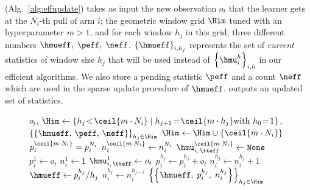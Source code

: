 \EFF (Alg.~\ref{alg:effupdate}) takes as input the new observation $o_t$ that the learner gets at the $N_i$-th pull of arm $i$; the geometric window grid $\Him$ tuned with an hyperparameter $m>1$, and for each window $h_j$ in this grid, three different numbers $\hmueff,\; \peff, \; \neff$. $\left\{\hmueff\right\}_{i,h_j}$ represents the set of \emph{current} statistics of window size $h_j$ that will be used instead of $\left\{\hmu_i^h\right\}_{i,h}$ in our efficient algorithms. We also store a pending statistic $\peff$ and a count $\neff$  which are used in the sparse update procedure of $\hmueff$. \EFF outputs an updated set of statistics.  
\begin{figure}[!ht]
\begin{minipage}{\textwidth}
\renewcommand*\footnoterule{}
\begin{savenotes}
\begin{algorithm}[H]
\caption{{\EFF}}
\label{alg:effupdate}
\begin{algorithmic}[1]
\Require $o_t$, \small $\Him \gets \left\{h_j \! <\! \ceil{m \cdot N_i} \; | \;  h_{j+1} \!=\! \ceil{m \cdot h_j}  \text{with } h_0 \!=\! 1\right\} $\normalsize, $\left\{ \{ \hmueff,\, \peff, \, \neff \}\right\}_{h_j \in \Him}$
\label{algline:effu-new-condition}   
\State $\Him \gets \Him \cup \left\{ \ceil{m \cdot N_i} \right\}$\label{algline:effu-new-h}
\State $p_i^{\ceil{m \cdot N_i} } = p_i^{N_i} $\label{algline:effu-new-p}
\State $n_i^{\ceil{m \cdot N_i} } \gets n_i^{N_i} $\label{algline:effu-new-n}
\State $\hmu_{i, \, \tteff}^{\ceil{m \cdot N_i} }\leftarrow \texttt{None}$\label{algline:effu-new-mu}
\EndIf\label{algline:effu-new-end} 
\State $p_i^{1} \gets o_t$ \label{algline:effu-update-first-p} 
\State $n_i^{1} \gets 1$\label{algline:effu-update-first-n}
\State $\hmu_{i, \, \tteff}^{1}\leftarrow o_t$ \label{algline:effu-update-first-hmu}
\label{algline:effu-update-start} 
\State $p_i^{h_j} \gets p_i^{h_j}  +o_t$\label{algline:effu-update-p}
\State $n_i^{h_j} \gets n_i^{h_j} + 1$\label{algline:effu-update-n}
\EndFor\label{algline:effu-update-end} 
\label{algline:effu-refresh-start}
 \label{algline:effu-refresh-condition}
\State $\hmueff \leftarrow p_i^{h_j}/h_j$ \label{algline:effu-refresh-hmu}
 \label{algline:effu-refresh-p}
\State $n_i^{h_{j}} \gets n_i^{h_{j-1}} $\label{algline:effu-refresh-n}
\EndIf
\EndFor \label{algline:effu-refresh-end}
\Ensure $\left\{\left\{  \hmueff,\; p_i^{h_j}, \; n_i^{h_j} \right\}\right\}_{h_j \in \Him}$
\end{algorithmic}
\end{algorithm}
\end{savenotes}
\end{minipage}
\end{figure}
